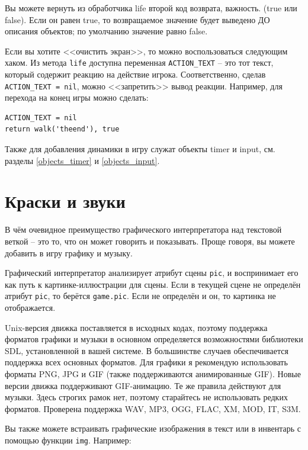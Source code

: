 \documentclass[12pt]{article}
\begin{document}
Вы можете вернуть из обработчика life второй код возврата, важность. (true или false). Если он равен true, то возвращаемое значение будет выведено ДО описания объектов; по умолчанию значение равно false.

Если вы хотите <<очистить экран>>, то можно воспользоваться следующим хаком. Из метода \verb/life/ доступна переменная \verb/ACTION_TEXT/ -- это тот текст, который содержит реакцию на действие игрока. Соответственно, сделав \verb/ACTION_TEXT = nil/, можно <<запретить>> вывод реакции. Например, для перехода на конец игры можно сделать:

\begin{verbatim}
ACTION_TEXT = nil
return walk('theend'), true
\end{verbatim}

Также для добавления динамики в игру служат объекты timer и input, см. разделы \ref{objects_timer} и \ref{objects_input}.

\section{Краски и звуки}

В чём очевидное преимущество графического интерпретатора над текстовой веткой -- это то, что он может говорить и показывать. Проще говоря, вы можете добавить в игру графику и музыку.

Графический интерпретатор анализирует атрибут сцены \verb/pic/, и воспринимает его как путь к картинке-ил\-лю\-страции для сцены. Если в текущей сцене не определён атрибут \verb/pic/, то берётся \verb/game.pic/. Если не определён и он, то картинка не отображается.

Unix-версия движка поставляется в исходных кодах, поэтому поддержка форматов графики и музыки в основном определяется возможностями библиотеки SDL, установленной в вашей системе. В большинстве случаев обеспечивается поддержка всех основных форматов. Для графики я рекомендую использовать форматы PNG, JPG и GIF (также поддерживаются анимированные GIF). Новые версии движка поддерживают GIF-анимацию. Те же правила действуют для музыки. Здесь строгих рамок нет, поэтому старайтесь не использовать редких форматов. Проверена поддержка WAV, MP3, OGG, FLAC, XM, MOD, IT, S3M.

Вы также можете встраивать графические изображения в текст или в инвентарь с помощью функции \verb/img/. Например:
\end{document}

